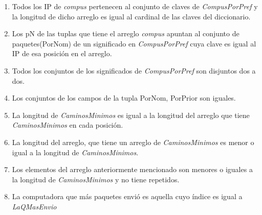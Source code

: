 \begin{enumerate}
	\item Todos los IP de \textit{compus} pertenecen al conjunto de claves de \textit{CompusPorPref} y la longitud de dicho arreglo es igual al cardinal de las claves del diccionario. 
	\item Los pN de las tuplas que tiene el arreglo \textit{compus} apuntan al conjunto de paquetes(PorNom) de un significado en \textit{CompusPorPref} cuya clave es igual al IP de esa posición en el arreglo.
	\item Todos los conjuntos de los significados de \textit{CompusPorPref} son disjuntos dos a dos.
  \item Los conjuntos de los campos de la tupla PorNom, PorPrior son iguales.
  \item La longitud de \textit{CaminosMinimos} es igual a la longitud del arreglo que tiene \textit{CaminosMinimos} en cada posición.
  \item La longitud del arreglo, que tiene un arreglo de \textit{CaminosMinimos} es menor o igual a la longitud de \textit{CaminosMinimos}.
  \item Los elementos del arreglo anteriormente mencionado son menores o iguales a la longitud de \textit{CaminosMinimos} y no tiene repetidos.
  \item La computadora que más paquetes envió es aquella cuyo índice es igual a \textit{LaQMasEnvio}

\end{enumerate}

